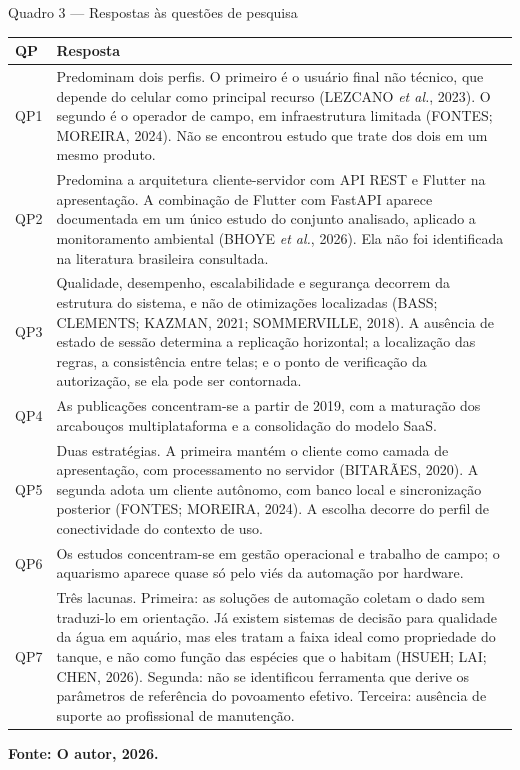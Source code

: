 \documentclass[12pt,oneside,a4paper,brazilian]{abntex2}
\newcommand{\legendaabnt}[1]{%
  \par\vspace{9pt}%
  \begingroup\centering\normalsize\SingleSpacing #1\par\endgroup
  \vspace{3pt}}
\newcommand{\fonteabnt}[1]{%
  \par\vspace{3pt}%
  \begingroup\centering\normalsize\SingleSpacing\bfseries #1\par\endgroup
  \vspace{9pt}}
\begin{document}
\legendaabnt{Quadro 3 --- Respostas às questões de pesquisa}
{\footnotesize\SingleSpacing
\setlength{\LTpre}{0pt}\setlength{\LTpost}{0pt}
\setlength{\extrarowheight}{3pt}
\begin{longtable}{|>{\raggedright\arraybackslash}p{1.0cm}|>{\raggedright\arraybackslash}p{13.6cm}|}
\hline
\textbf{QP} & \textbf{Resposta} \\[2pt] \hline \endhead
QP1 & Predominam dois perfis. O primeiro é o usuário final não técnico, que depende do celular como principal recurso (LEZCANO \textit{et al.}, 2023). O segundo é o operador de campo, em infraestrutura limitada (FONTES; MOREIRA, 2024). Não se encontrou estudo que trate dos dois em um mesmo produto. \\[2pt] \hline
QP2 & Predomina a arquitetura cliente-servidor com API REST e Flutter na apresentação. A combinação de Flutter com FastAPI aparece documentada em um único estudo do conjunto analisado, aplicado a monitoramento ambiental (BHOYE \textit{et al.}, 2026). Ela não foi identificada na literatura brasileira consultada. \\[2pt] \hline
QP3 & Qualidade, desempenho, escalabilidade e segurança decorrem da estrutura do sistema, e não de otimizações localizadas (BASS; CLEMENTS; KAZMAN, 2021; SOMMERVILLE, 2018). A ausência de estado de sessão determina a replicação horizontal; a localização das regras, a consistência entre telas; e o ponto de verificação da autorização, se ela pode ser contornada. \\[2pt] \hline
QP4 & As publicações concentram-se a partir de 2019, com a maturação dos arcabouços multiplataforma e a consolidação do modelo SaaS. \\[2pt] \hline
QP5 & Duas estratégias. A primeira mantém o cliente como camada de apresentação, com processamento no servidor (BITARÃES, 2020). A segunda adota um cliente autônomo, com banco local e sincronização posterior (FONTES; MOREIRA, 2024). A escolha decorre do perfil de conectividade do contexto de uso. \\[2pt] \hline
QP6 & Os estudos concentram-se em gestão operacional e trabalho de campo; o aquarismo aparece quase só pelo viés da automação por hardware. \\[2pt] \hline
QP7 & Três lacunas. Primeira: as soluções de automação coletam o dado sem traduzi-lo em orientação. Já existem sistemas de decisão para qualidade da água em aquário, mas eles tratam a faixa ideal como propriedade do tanque, e não como função das espécies que o habitam (HSUEH; LAI; CHEN, 2026). Segunda: não se identificou ferramenta que derive os parâmetros de referência do povoamento efetivo. Terceira: ausência de suporte ao profissional de manutenção. \\[2pt] \hline
\end{longtable}}
\fonteabnt{Fonte: O autor, 2026.}
\end{document}
